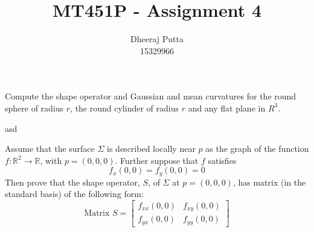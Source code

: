 \documentclass[12pt, answers]{exam}
\title{MT451P - Assignment 4}
\author{Dheeraj Putta \\ 15329966}
\date{}
\begin{document}
    \maketitle
    \begin{questions}
        \thispagestyle{foot}
        \question Compute the shape operator and Gaussian and mean curvatures for the round sphere of radius $r$, the round
        cylinder of radius $r$ and any flat plane in $R^3$.

        \begin{solution}
            asd
        \end{solution}

        \question Assume that the surface $\Sigma$ is described locally near $p$ as the graph of the function
        $f: \mathbb{R}^2 \rightarrow \mathbb{R}$, with $p = (0, 0, 0)$. Further suppose that $f$ satisfies
        \[ f_x(0, 0) = f_y(0, 0) = 0 \]
        Then prove that the shape operator, $S$, of $\Sigma$ at $p = (0, 0, 0)$, has matrix (in the standard basis)
        of the following form:
        \[
            \text{Matrix } S =
            \begin{bmatrix}
                f_{xx}(0, 0) & f_{xy}(0, 0) \\
                f_{yx}(0, 0) & f_{yy}(0, 0)
            \end{bmatrix}
        \]


\end{questions}
\end{document}
